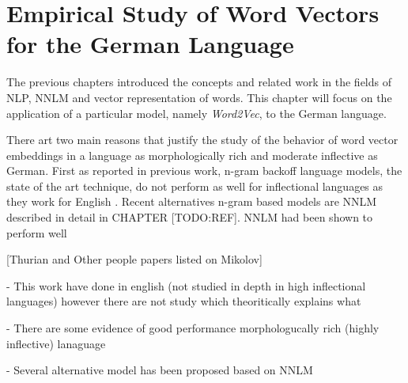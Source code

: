 \chapter{Empirical Study of Word Vectors for the German Language}
\label{chapter:wor2vec_german}










The previous chapters introduced the concepts and related work  in the fields
of  \ac{NLP}, \ac{NNLM} and vector representation of words. This chapter will
focus on the application of a particular model, namely \textit{Word2Vec}, to
the German language.  

There art two main reasons that justify the study of the behavior of word
vector embeddings in a language as morphologically rich and moderate inflective
as German.  First  as reported in previous work, n-gram backoff language models, the state of the art
technique, do not perform  as well for inflectional  languages as they work
for English \cite{conf/icassp/MikolovKBGC09}. Recent alternatives
n-gram based models are \ac{NNLM} \cite{Bengio:2003:NPL:944919.944966} described
in detail in CHAPTER [TODO:REF]. \ac{NNLM} had been shown to perform well \cite{conf/icassp/MikolovKBGC09}



 [Thurian and
Other people papers listed on Mikolov]

- This work have done in english (not studied in depth in high inflectional
languages) however there are not study which theoritically explains what 

- There are some evidence of good performance morphologucally rich (highly
inflective) lanaguage 


- Several alternative model has been proposed based on \ac{NNLM}

